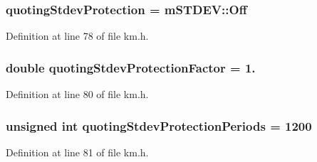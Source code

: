 \subsubsection[{\texorpdfstring{quoting\+Stdev\+Protection}{quotingStdevProtection}}]{ quoting\+Stdev\+Protection = {\bf m\+S\+T\+D\+E\+V\+::\+Off}}\hypertarget{struct_k_1_1m_quoting_params_ac799b2adc766e961b812d1a97d97063c}{}\label{struct_k_1_1m_quoting_params_ac799b2adc766e961b812d1a97d97063c}


Definition at line 78 of file km.\+h.

\subsubsection[{\texorpdfstring{quoting\+Stdev\+Protection\+Factor}{quotingStdevProtectionFactor}}]{\setlength{\rightskip}{0pt plus 5cm}double quoting\+Stdev\+Protection\+Factor = 1.}\hypertarget{struct_k_1_1m_quoting_params_ac560879d917a01a352c44d54cc9cbadb}{}\label{struct_k_1_1m_quoting_params_ac560879d917a01a352c44d54cc9cbadb}


Definition at line 80 of file km.\+h.

\subsubsection[{\texorpdfstring{quoting\+Stdev\+Protection\+Periods}{quotingStdevProtectionPeriods}}]{\setlength{\rightskip}{0pt plus 5cm}unsigned int quoting\+Stdev\+Protection\+Periods = 1200}\hypertarget{struct_k_1_1m_quoting_params_ad94d984ac4098971a3d44ce736edefb0}{}\label{struct_k_1_1m_quoting_params_ad94d984ac4098971a3d44ce736edefb0}


Definition at line 81 of file km.\+h.

